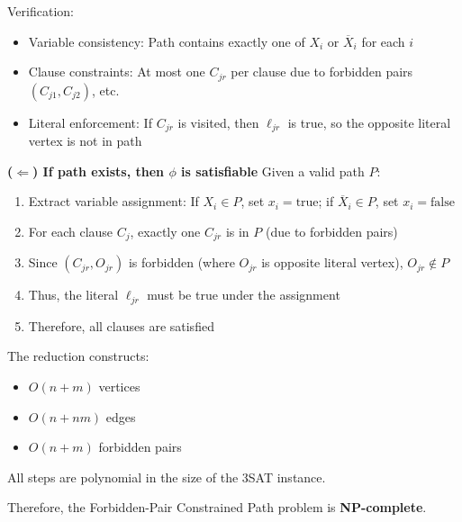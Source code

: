 Verification:
\begin{itemize}
    \item Variable consistency: Path contains exactly one of $X_i$ or $\overline{X}_i$ for each $i$
    \item Clause constraints: At most one $C_{jr}$ per clause due to forbidden pairs $(C_{j1}, C_{j2})$, etc.
    \item Literal enforcement: If $C_{jr}$ is visited, then $\ell_{jr}$ is true, so the opposite literal vertex is not in path
\end{itemize}

\textbf{($\Leftarrow$) If path exists, then $\phi$ is satisfiable}
Given a valid path $P$:
\begin{enumerate}
    \item Extract variable assignment: If $X_i \in P$, set $x_i = \text{true}$; if $\overline{X}_i \in P$, set $x_i = \text{false}$
    \item For each clause $C_j$, exactly one $C_{jr}$ is in $P$ (due to forbidden pairs)
    \item Since $(C_{jr}, O_{jr})$ is forbidden (where $O_{jr}$ is opposite literal vertex), $O_{jr} \notin P$
    \item Thus, the literal $\ell_{jr}$ must be true under the assignment
    \item Therefore, all clauses are satisfied
\end{enumerate}


The reduction constructs:
\begin{itemize}
    \item $O(n + m)$ vertices
    \item $O(n + nm)$ edges
    \item $O(n + m)$ forbidden pairs
\end{itemize}
All steps are polynomial in the size of the 3SAT instance.

Therefore, the Forbidden-Pair Constrained Path problem is \textbf{NP-complete}.
\newpage
